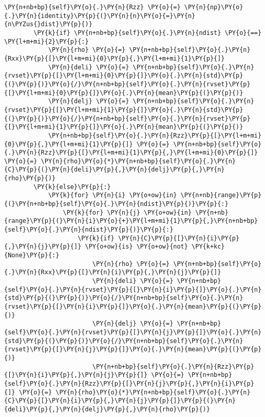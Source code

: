 \begin{tcolorbox}[breakable, size=fbox, boxrule=1pt, pad at break*=1mm,colback=cellbackground, colframe=cellborder]
\begin{Verbatim}[commandchars=\\\{\}]
        \PY{n+nb+bp}{self}\PY{o}{.}\PY{n}{Rzz} \PY{o}{=} \PY{n}{np}\PY{o}{.}\PY{n}{identity}\PY{p}{(}\PY{n}{n}\PY{o}{=}\PY{n}{n\PYZus{}dist}\PY{p}{)}
        \PY{k}{if} \PY{n+nb+bp}{self}\PY{o}{.}\PY{n}{ndist} \PY{o}{==} \PY{l+m+mi}{2}\PY{p}{:}
            \PY{n}{rho} \PY{o}{=} \PY{n+nb+bp}{self}\PY{o}{.}\PY{n}{Rxx}\PY{p}{[}\PY{l+m+mi}{0}\PY{p}{,}\PY{l+m+mi}{1}\PY{p}{]}
            \PY{n}{deli} \PY{o}{=} \PY{n+nb+bp}{self}\PY{o}{.}\PY{n}{rvset}\PY{p}{[}\PY{l+m+mi}{0}\PY{p}{]}\PY{o}{.}\PY{n}{std}\PY{p}{(}\PY{p}{)}\PY{o}{/}\PY{n+nb+bp}{self}\PY{o}{.}\PY{n}{rvset}\PY{p}{[}\PY{l+m+mi}{0}\PY{p}{]}\PY{o}{.}\PY{n}{mean}\PY{p}{(}\PY{p}{)}
            \PY{n}{delj} \PY{o}{=} \PY{n+nb+bp}{self}\PY{o}{.}\PY{n}{rvset}\PY{p}{[}\PY{l+m+mi}{1}\PY{p}{]}\PY{o}{.}\PY{n}{std}\PY{p}{(}\PY{p}{)}\PY{o}{/}\PY{n+nb+bp}{self}\PY{o}{.}\PY{n}{rvset}\PY{p}{[}\PY{l+m+mi}{1}\PY{p}{]}\PY{o}{.}\PY{n}{mean}\PY{p}{(}\PY{p}{)}
            \PY{n+nb+bp}{self}\PY{o}{.}\PY{n}{Rzz}\PY{p}{[}\PY{l+m+mi}{0}\PY{p}{,}\PY{l+m+mi}{1}\PY{p}{]} \PY{o}{=} \PY{n+nb+bp}{self}\PY{o}{.}\PY{n}{Rzz}\PY{p}{[}\PY{l+m+mi}{1}\PY{p}{,}\PY{l+m+mi}{0}\PY{p}{]} \PY{o}{=} \PY{n}{rho}\PY{o}{*}\PY{n+nb+bp}{self}\PY{o}{.}\PY{n}{C}\PY{p}{(}\PY{n}{deli}\PY{p}{,}\PY{n}{delj}\PY{p}{,}\PY{n}{rho}\PY{p}{)}
        \PY{k}{else}\PY{p}{:}
            \PY{k}{for} \PY{n}{i} \PY{o+ow}{in} \PY{n+nb}{range}\PY{p}{(}\PY{n+nb+bp}{self}\PY{o}{.}\PY{n}{ndist}\PY{p}{)}\PY{p}{:}
                \PY{k}{for} \PY{n}{j} \PY{o+ow}{in} \PY{n+nb}{range}\PY{p}{(}\PY{n}{i}\PY{o}{+}\PY{l+m+mi}{1}\PY{p}{,}\PY{n+nb+bp}{self}\PY{o}{.}\PY{n}{ndist}\PY{p}{)}\PY{p}{:}
                    \PY{k}{if} \PY{n}{C}\PY{p}{[}\PY{n}{i}\PY{p}{,}\PY{n}{j}\PY{p}{]} \PY{o+ow}{is} \PY{o+ow}{not} \PY{k+kc}{None}\PY{p}{:}
                        \PY{n}{rho} \PY{o}{=} \PY{n+nb+bp}{self}\PY{o}{.}\PY{n}{Rxx}\PY{p}{[}\PY{n}{i}\PY{p}{,}\PY{n}{j}\PY{p}{]}
                        \PY{n}{deli} \PY{o}{=} \PY{n+nb+bp}{self}\PY{o}{.}\PY{n}{rvset}\PY{p}{[}\PY{n}{i}\PY{p}{]}\PY{o}{.}\PY{n}{std}\PY{p}{(}\PY{p}{)}\PY{o}{/}\PY{n+nb+bp}{self}\PY{o}{.}\PY{n}{rvset}\PY{p}{[}\PY{n}{i}\PY{p}{]}\PY{o}{.}\PY{n}{mean}\PY{p}{(}\PY{p}{)}
                        \PY{n}{delj} \PY{o}{=} \PY{n+nb+bp}{self}\PY{o}{.}\PY{n}{rvset}\PY{p}{[}\PY{n}{j}\PY{p}{]}\PY{o}{.}\PY{n}{std}\PY{p}{(}\PY{p}{)}\PY{o}{/}\PY{n+nb+bp}{self}\PY{o}{.}\PY{n}{rvset}\PY{p}{[}\PY{n}{j}\PY{p}{]}\PY{o}{.}\PY{n}{mean}\PY{p}{(}\PY{p}{)}
                        \PY{n+nb+bp}{self}\PY{o}{.}\PY{n}{Rzz}\PY{p}{[}\PY{n}{i}\PY{p}{,}\PY{n}{j}\PY{p}{]} \PY{o}{=} \PY{n+nb+bp}{self}\PY{o}{.}\PY{n}{Rzz}\PY{p}{[}\PY{n}{j}\PY{p}{,}\PY{n}{i}\PY{p}{]} \PY{o}{=} \PY{n}{rho}\PY{o}{*}\PY{n+nb+bp}{self}\PY{o}{.}\PY{n}{C}\PY{p}{[}\PY{n}{i}\PY{p}{,}\PY{n}{j}\PY{p}{]}\PY{p}{(}\PY{n}{deli}\PY{p}{,}\PY{n}{delj}\PY{p}{,}\PY{n}{rho}\PY{p}{)}


\end{Verbatim}
\end{tcolorbox}
